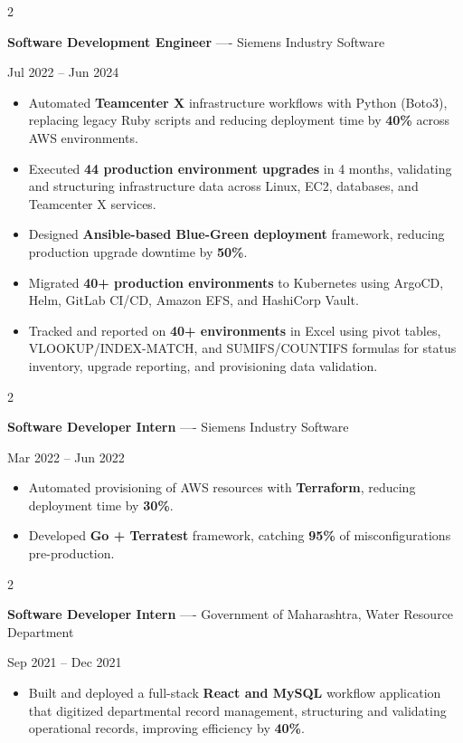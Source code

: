 \documentclass[10pt, letterpaper]{article}
\newenvironment{highlights}{
    \begin{itemize}[
        topsep=0.10 cm,
        parsep=0.06 cm,
        partopsep=0pt,
        itemsep=0.06 cm,
        leftmargin=12pt
    ]
}{
    \end{itemize}
}
\newenvironment{twocolentry}[2][]{
    \onecolentry
    \def\secondColumn{#2}
    \setcolumnwidth{\fill, 4.5 cm}
    \begin{paracol}{2}
}{
    \switchcolumn \raggedleft \secondColumn
    \end{paracol}
    \endonecolentry
}
\begin{document}
\vspace{0.15 cm}

\begin{twocolentry}{Jul 2022 -- Jun 2024}
\textbf{Software Development Engineer} ---- Siemens Industry Software
\end{twocolentry}
\begin{highlights}
  \item Automated \textbf{Teamcenter X} infrastructure workflows with Python (Boto3), replacing legacy Ruby scripts and reducing deployment time by \textbf{40\%} across AWS environments.
  \item Executed \textbf{44 production environment upgrades} in 4 months, validating and structuring infrastructure data across Linux, EC2, databases, and Teamcenter X services.
  \item Designed \textbf{Ansible-based Blue-Green deployment} framework, reducing production upgrade downtime by \textbf{50\%}.
  \item Migrated \textbf{40+ production environments} to Kubernetes using ArgoCD, Helm, GitLab CI/CD, Amazon EFS, and HashiCorp Vault.
  \item Tracked and reported on \textbf{40+ environments} in Excel using pivot tables, VLOOKUP/INDEX-MATCH, and SUMIFS/COUNTIFS formulas for status inventory, upgrade reporting, and provisioning data validation.
\end{highlights}

\vspace{0.15 cm}

\begin{twocolentry}{Mar 2022 -- Jun 2022}
\textbf{Software Developer Intern} ---- Siemens Industry Software
\end{twocolentry}
\begin{highlights}
  \item Automated provisioning of AWS resources with \textbf{Terraform}, reducing deployment time by \textbf{30\%}.
  \item Developed \textbf{Go + Terratest} framework, catching \textbf{95\%} of misconfigurations pre-production.
\end{highlights}

\vspace{0.15 cm}

\begin{twocolentry}{Sep 2021 -- Dec 2021}
\textbf{Software Developer Intern} ---- Government of Maharashtra, Water Resource Department
\end{twocolentry}
\begin{highlights}
  \item Built and deployed a full-stack \textbf{React and MySQL} workflow application that digitized departmental record management, structuring and validating operational records, improving efficiency by \textbf{40\%}.
\end{highlights}
\end{document}
